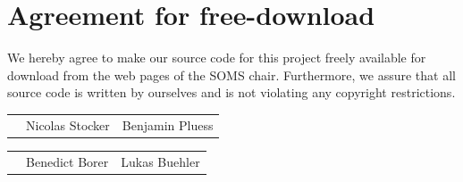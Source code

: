 \documentclass[11pt]{article}
\begin{document}

\newpage


\newpage
\section*{Agreement for free-download}
\bigskip


\bigskip


\large We hereby agree to make our source code for this project freely available for download from the web pages of the SOMS chair. Furthermore, we assure that all source code is written by ourselves and is not violating any copyright restrictions.

\begin{center}

\bigskip


\bigskip


\begin{tabular}{@{}p{3.3cm}@{}p{6cm}@{}@{}p{6cm}@{}}
\begin{minipage}{3cm}

\end{minipage}
&
\begin{minipage}{6cm}
\vspace{2mm} \large Nicolas Stocker 


 \vspace{\baselineskip}

\end{minipage}
&
\begin{minipage}{6cm}

\large Benjamin Pluess

\end{minipage}
\end{tabular}

\bigskip
\bigskip
\bigskip

\begin{tabular}{@{}p{3.3cm}@{}p{6cm}@{}@{}p{6cm}@{}}
\begin{minipage}{3cm}

\end{minipage}
&
\begin{minipage}{6cm}
\vspace{2mm} \large Benedict Borer 


 \vspace{\baselineskip}

\end{minipage}
&
\begin{minipage}{6cm}

\large Lukas Buehler

\end{minipage}
\end{tabular}


\end{center}
\newpage
\end{document}
